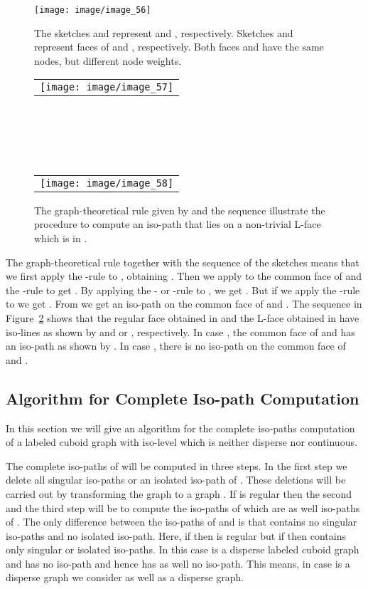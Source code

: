 \documentclass[a4paper,11pt]{article}
\begin{document}
\begin{figure}[!ht]
\texttt{[image: image/image\_56]}
\caption{The sketches  and  represent  and ,
respectively. Sketches  and  represent faces of  and
, respectively. Both faces  and  have the same nodes, but
different node weights.}
\label{image_56}
\end{figure}
\FloatBarrier
\begin{figure}[!ht]

\begin{tabular}[c]{l}
\texttt{[image: image/image\_57]}
\end{tabular}\\ \\
\mbox{}\\ \\

\begin{tabular}[c]{l}
\texttt{[image: image/image\_58]}
\end{tabular}
\caption{The graph-theoretical rule given by  and the sequence  illustrate the procedure
to compute an iso-path that lies on a non-trivial L-face which is in .}
\label{image_57_58}
\end{figure}
\FloatBarrier
{}The graph-theoretical rule  together with
the sequence of the sketches  means that we first apply the -rule to , obtaining .
Then we apply to the common face of  and  the -rule to get . By applying the - or
-rule to , we get . But if we apply the -rule to  we get
. From  we get an iso-path on the common face of  and . The
sequence  in Figure~\ref{image_57_58} shows that the regular face obtained in  and the
L-face obtained in  have iso-lines as shown by  and  or , respectively.
In case , the common face of  and  has an iso-path as shown by . In case , there
is no iso-path on the common face of  and .
\FloatBarrier

\subsection{Algorithm for Complete Iso-path Computation}
In this section we will give an algorithm for the complete iso-paths computation of a labeled cuboid graph
 with iso-level  which is neither disperse nor continuous.

The complete iso-paths of  will be computed in three steps. In the first step we delete all singular
iso-paths or an isolated iso-path of . These deletions will be carried out by transforming the graph
 to a graph . If  is regular then the second and the third step will be
to compute the iso-paths of  which are as well iso-paths of . The only difference between the
iso-paths of  and  is that  contains no singular iso-paths and no isolated iso-path. Here,
if  then  is regular but if  then  contains only singular or isolated iso-paths.
In this case  is a disperse labeled cuboid graph and has no iso-path and hence  has as well no iso-path.
This means, in case  is a disperse graph we consider as well  as a disperse graph.\\
\end{document}
